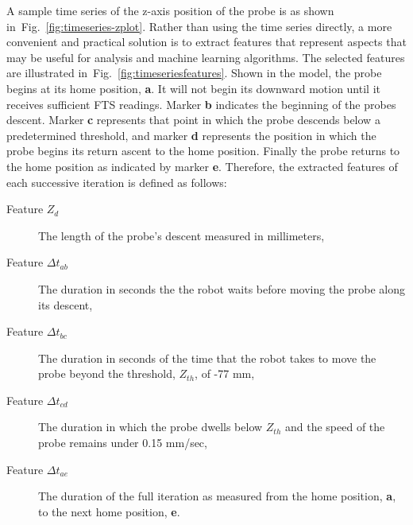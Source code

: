 	  A sample time series of the z-axis position of the probe is as shown in~Fig.~\ref{fig:timeseries-zplot}.  Rather than using the time series directly, a more convenient and practical solution is to extract features that represent aspects that may be useful for analysis and machine learning algorithms. The selected features are illustrated in~Fig.~\ref{fig:timeseriesfeatures}. Shown in the model, the probe begins at its home position, \textbf{a}.  It will not begin its downward motion until it receives sufficient FTS readings.  Marker \textbf{b} indicates the beginning of the probes descent.  Marker \textbf{c} represents that point in which the probe descends below a predetermined threshold, and marker \textbf{d} represents the position in which the probe begins its return ascent to the home position.  Finally the probe returns to the home position as indicated by marker \textbf{e}.  Therefore, the extracted features of each successive iteration is defined as follows:
	
	\begin{description}
        \item[Feature $Z_d$] The length of the probe's descent measured in millimeters,
        \item[Feature $\Delta{t}_{ab}$] The duration in seconds the the robot waits before moving the probe along its descent,
        \item[Feature $\Delta{t}_{bc}$] The duration in seconds of the time that the robot takes to move the probe beyond the threshold, $Z_{th}$, of -77 mm,
        \item[Feature $\Delta{t}_{cd}$] The duration in which the probe dwells below $Z_{th}$ and the speed of the probe remains under 0.15 mm/sec,
        \item[Feature $\Delta{t}_{ae}$] The duration of the full iteration as measured from the home position, \textbf{a}, to the next home position, \textbf{e}.
	\end{description}
	

